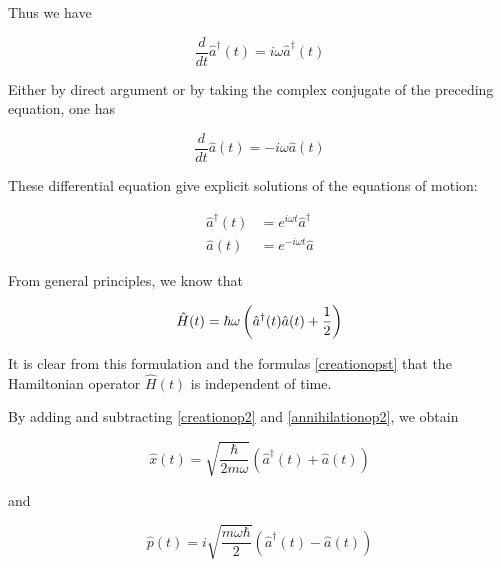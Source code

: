 Thus we have

\begin{equation}
\frac{d}{dt}\hat a^\dagger(t) = i\omega \hat a^\dagger(t)
\end{equation}

Either by direct argument or by taking the complex conjugate of the preceding equation, one has

\begin{equation}
\frac{d}{dt}\hat a(t) = -i\omega \hat a(t)
\end{equation}

These differential equation give explicit solutions of the equations of motion:

\begin{align}
\label{creationopst}
\hat a^\dagger(t) &= e^{i\omega t} \hat a^\dagger  \\
 \hat a(t) &= e^{-i\omega t} \hat a
\end{align}

From general principles, we know that

\begin{equation}
\hat H(t) = \hbar \omega\left(\hat a^\dagger(t)  \hat a(t)
+ \small{\frac{1}{2}} \right)
\end{equation}

It is clear from this formulation and the formulas  \eqref{creationopst} that the Hamiltonian operator $\hat H(t)$ is independent of time.

\begin{remark}
By adding and subtracting \eqref{creationop2} and \eqref{annihilationop2}, we obtain
\end{remark}


\begin{equation}
\hat x(t) = \sqrt{\frac{\hbar}{2m\omega}}\left( \hat a^\dagger(t) + \hat a(t) \right)
\end{equation}


and


\begin{equation}
\hat p(t) = i\sqrt{\frac{m\omega\hbar}{2}}\left( \hat a^\dagger(t)  - \hat a(t) \right)
\end{equation}
